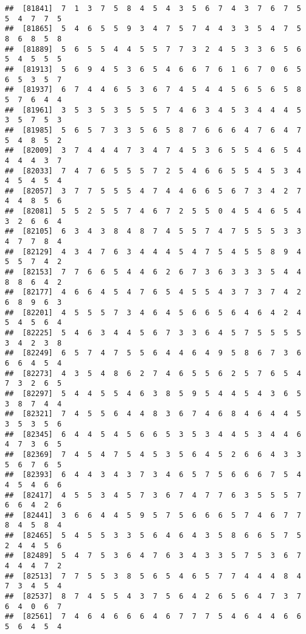 \documentclass[
]{book}
\begin{document}
\begin{verbatim}
##  [81841]  7  1  3  7  5  8  4  5  4  3  5  6  7  4  3  7  6  7  5  5  4  7  7  5
##  [81865]  5  4  6  5  5  9  3  4  7  5  7  4  4  3  3  5  4  7  5  8  6  8  5  8
##  [81889]  5  6  5  5  4  4  5  5  7  7  3  2  4  5  3  3  6  5  6  5  4  5  5  5
##  [81913]  5  6  9  4  5  3  6  5  4  6  6  7  6  1  6  7  0  6  5  6  5  3  5  7
##  [81937]  6  7  4  4  6  5  3  6  7  4  5  4  4  5  6  5  6  5  8  5  7  6  4  4
##  [81961]  3  5  3  5  3  5  5  5  7  4  6  3  4  5  3  4  4  4  5  3  5  7  5  3
##  [81985]  5  6  5  7  3  3  5  6  5  8  7  6  6  6  4  7  6  4  7  5  4  8  5  2
##  [82009]  3  7  4  4  4  7  3  4  7  4  5  3  6  5  5  4  6  5  4  4  4  4  3  7
##  [82033]  7  4  7  6  5  5  5  7  2  5  4  6  6  5  5  4  5  3  4  4  5  4  5  4
##  [82057]  3  7  7  5  5  5  4  7  4  4  6  6  5  6  7  3  4  2  7  4  4  8  5  6
##  [82081]  5  5  2  5  5  7  4  6  7  2  5  5  0  4  5  4  6  5  4  3  2  6  6  4
##  [82105]  6  3  4  3  8  4  8  7  4  5  5  7  4  7  5  5  5  3  3  4  7  7  8  4
##  [82129]  4  3  4  7  6  3  4  4  4  5  4  7  5  4  5  5  8  9  4  5  5  7  4  2
##  [82153]  7  7  6  6  5  4  4  6  2  6  7  3  6  3  3  3  5  4  4  8  8  6  4  2
##  [82177]  4  6  6  4  5  4  7  6  5  4  5  5  4  3  7  3  7  4  2  6  8  9  6  3
##  [82201]  4  5  5  5  7  3  4  6  4  5  6  6  5  6  4  6  4  2  4  5  4  5  6  4
##  [82225]  5  4  6  3  4  4  5  6  7  3  3  6  4  5  7  5  5  5  5  3  4  2  3  8
##  [82249]  6  5  7  4  7  5  5  6  4  4  6  4  9  5  8  6  7  3  6  6  6  4  5  4
##  [82273]  4  3  5  4  8  6  2  7  4  6  5  5  6  2  5  7  6  5  4  7  3  2  6  5
##  [82297]  5  4  4  5  5  4  6  3  8  5  9  5  4  4  5  4  3  6  5  3  8  7  4  4
##  [82321]  7  4  5  5  6  4  4  8  3  6  7  4  6  8  4  6  4  4  5  3  5  3  5  6
##  [82345]  6  4  4  5  4  5  6  6  5  3  5  3  4  4  5  3  4  4  6  4  7  3  6  5
##  [82369]  7  4  5  4  7  5  4  5  3  5  6  4  5  2  6  6  4  3  3  5  6  7  6  5
##  [82393]  6  4  4  3  4  3  7  3  4  6  5  7  5  6  6  6  7  5  4  4  5  4  6  6
##  [82417]  4  5  5  3  4  5  7  3  6  7  4  7  7  6  3  5  5  5  7  6  6  4  2  6
##  [82441]  3  6  6  4  4  5  9  5  7  5  6  6  6  5  7  4  6  7  7  8  4  5  8  4
##  [82465]  5  4  5  5  3  3  5  6  4  6  4  3  5  8  6  6  5  7  5  2  4  4  5  6
##  [82489]  5  4  7  5  3  6  4  7  6  3  4  3  3  5  7  5  3  6  7  4  4  4  7  2
##  [82513]  7  7  5  5  3  8  5  6  5  4  6  5  7  7  4  4  4  8  4  7  3  4  5  4
##  [82537]  8  7  4  5  5  4  3  7  5  6  4  2  6  5  6  4  7  3  7  6  4  0  6  7
##  [82561]  7  4  6  4  6  6  6  4  6  7  7  7  5  4  6  4  4  6  6  5  6  4  5  4

\end{verbatim}
\end{document}

